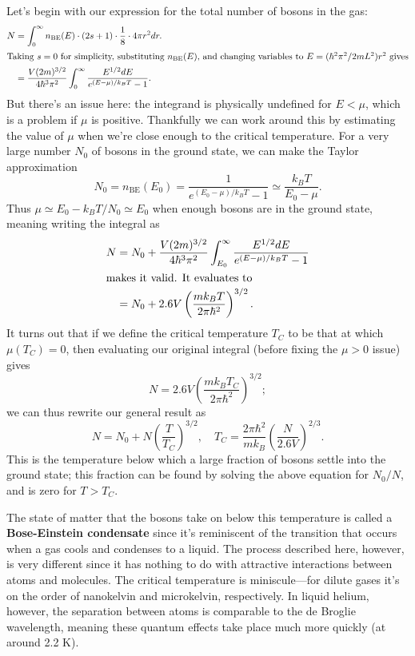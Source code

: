\documentclass[../p052main.tex]{subfiles}
\begin{document}
Let's begin with our expression for the total number of bosons in the gas:
\begin{align*}
    N &= \int_{0}^{\infty} n_\textrm{BE}(E) \cdot (2s+1) \cdot \frac{1}{8} \cdot 4\pi r^2 dr. \\
    \intertext{Taking $s=0$ for simplicity, substituting $n_\textrm{BE}(E)$, and changing variables to $E = (\hbar^2\pi^2 / 2mL^2)r^2$ gives}
    &= \frac{V(2m)^{3 / 2}}{4\hbar^3 \pi^2} \int_{0}^{\infty} \frac{E^{1 / 2} dE}{e^{(E - \mu)/k_BT} - 1}.
\end{align*}
But there's an issue here: the integrand is physically undefined for $E < \mu$, which is a problem if $\mu$ is positive.
Thankfully we can work around this by estimating the value of $\mu$ when we're close enough to the critical temperature.
For a very large number $N_0$ of bosons in the ground state, we can make the Taylor approximation
\[ N_0 = n_\textrm{BE}(E_0) = \frac{1}{e^{(E_0 - \mu) / k_BT} - 1} \simeq \frac{k_BT}{E_0 - \mu}. \]
Thus $\mu \simeq E_0 - k_BT / N_0 \simeq E_0$ when enough bosons are in the ground state, meaning writing the integral as
\begin{align*}
    N &= N_0 + \frac{V(2m)^{3 / 2}}{4\hbar^3 \pi^2} \int_{E_0}^{\infty} \frac{E^{1 / 2} dE}{e^{(E - \mu)/k_BT} - 1} \\
    \intertext{makes it valid. It evaluates to}
    &= N_0 + 2.6V \left( \frac{mk_BT}{2\pi\hbar^2} \right)^{3 / 2}.
\end{align*}
It turns out that if we define the critical temperature $T_C$ to be that at which $\mu(T_C) = 0$, then evaluating our original integral (before fixing the $\mu > 0$ issue) gives
\[ N = 2.6V \left( \frac{mk_BT_C}{2\pi\hbar^2} \right)^{3 / 2}; \]
we can thus rewrite our general result as
\[ N = N_0 + N \left( \frac{T}{T_C} \right)^{3 / 2}, \quad T_C = \frac{2\pi\hbar^2}{mk_B} \left( \frac{N}{2.6V} \right)^{2 / 3}. \]
This is the temperature below which a large fraction of bosons settle into the ground state; this fraction can be found by solving the above equation for $N_0 / N$, and is zero for $T > T_C$.

The state of matter that the bosons take on below this temperature is called a \textbf{Bose-Einstein condensate} since it's reminiscent of the transition that occurs when a gas cools and condenses to a liquid.
The process described here, however, is very different since it has nothing to do with attractive interactions between atoms and molecules.
The critical temperature is miniscule---for dilute gases it's on the order of nanokelvin and microkelvin, respectively.
In liquid helium, however, the separation between atoms is comparable to the de Broglie wavelength, meaning these quantum effects take place much more quickly (at around 2.2 K).
\end{document}
